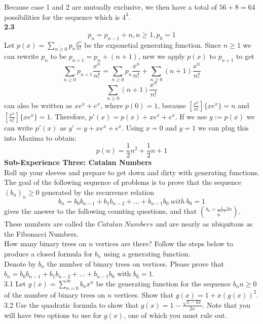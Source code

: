 \documentclass[10pt,a4paper]{report}
\begin{document}
	Because case 1 and 2 are mutually exclusive, we then have a total of $56 + 8 = 64$ possibilities for the sequence which is $4^3$.\\
	\newline
	\textbf{2.3}\\
	\[p_n = p_{n-1} + n, n\geq1, p_0 = 1\]
	Let $p(x) = \sum_{n\geq0}^{}p_n\frac{x^n}{n!}$ be the exponetial generating function.  Since $n\geq1$ we can rewrite $p_n$ to be $p_{n+1} = p_n+(n+1)$, new we apply $p(x)$ to $p_{n+1}$ to get \[\sum_{n\geq0}^{}p_{n+1}\frac{x^n}{n!} = \sum_{n\geq0}^{}p_n\frac{x^n}{n!} + \sum_{n\geq0}^{}(n+1)\frac{x^n}{n!}\]
	\[\sum_{n\geq0}^{}(n+1)\frac{x^n}{n!}\]
	can also be written as $xe^x+e^x$, where $p(0) = 1$, because $[\frac{x^n}{n!}]\{xe^x\} = n$ and $[\frac{x^n}{n!}]\{xe^x\} = 1$.  Therefore, $p'(x) = p(x) + xe^x + e^x$.  If we use $y:=p(x)$ we can write $p'(x)$ as $y' = y + xe^x + e^x$.  Using $x=0$ and $y=1$ we can plug this into Maxima to obtain:
	\[p(n) = \frac{1}{2}n^2 + \frac{1}{2}n + 1\]
	\textbf{Sub-Experience Three: Catalan Numbers}\\
	Roll up your sleeves and prepare to get down and dirty with generating functions.  The goal of the following sequence of problems is to prove that the sequence $(b_n)_n\geq0$ generated by the recurrence relation\\
	\[b_n = b_0b_{n-1} + b_1b_{n-2} + ... + b_{n-1}b_0\ with\ b_0 = 1\]
	gives the answer to the following counting questions, and that $b_n = \frac{1}{n+1}{2n}\choose{n}$.  These numbers are called the $Catalan\ Numbers$ and are nearly as ubiquitous as the Fibonacci Numbers.\\
	\newline
	How many binary trees on $n$ vertices are there?  Follow the steps below to produce a closed formula for $b_n$ using a generating function.\\
	 Denote by $b_n$ the number of binary trees on vertices.  Please prove that $b_n = b_0b_{n-1} + b_1b_{n-2} + ... + b_{n-1}b_0$ with $b_0 = 1$.\\
	3.1 Let $g(x) = \sum_{n=0}^{\infty}b_nx^n$ be the generating function for the sequence $b_n n\geq0$ of the number of binary trees on $n$ vertices.  Show that $g(x) = 1+x(g(x))^2$.\\
	3.2 Use the quadratic formula to show that $g(x) = 1-\frac{\sqrt{1-4x}}{2x}$. Note that you will have two options to use for $g(x)$, one of which you must rule out.\\
\end{document}
